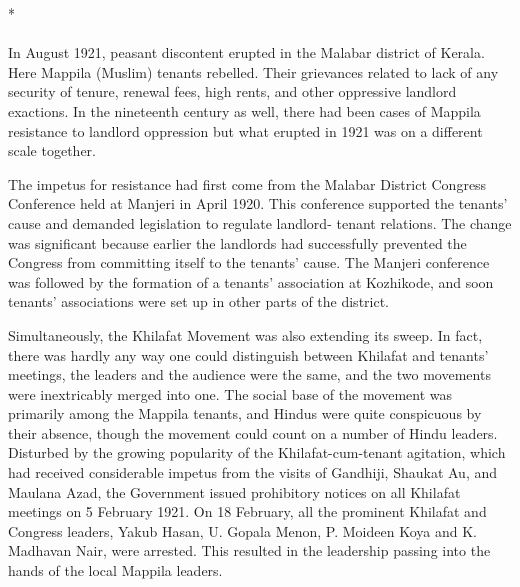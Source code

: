 \begin{multicols}{2}
\begin{center}*\end{center}

\paragraph*{}

In August 1921, peasant discontent erupted in the Malabar district of Kerala. Here Mappila (Muslim) tenants rebelled. Their grievances related to lack of any security of tenure, renewal fees, high rents, and other oppressive landlord exactions. In the nineteenth century as well, there had been cases of Mappila resistance to landlord oppression but what erupted in 1921 was on a different scale together.

The impetus for resistance had first come from the Malabar District Congress Conference held at Manjeri in April 1920. This conference supported the tenants' cause and demanded legislation to regulate landlord- tenant relations. The change was significant because earlier the landlords had successfully prevented the Congress from committing itself to the tenants' cause. The Manjeri conference was followed by the formation of a tenants' association at Kozhikode, and soon tenants' associations were set up in other parts of the district.

Simultaneously, the Khilafat Movement was also extending its sweep. In fact, there was hardly any way one could distinguish between Khilafat and tenants' meetings, the leaders and the audience were the same, and the two movements were inextricably merged into one. The social base of the movement was primarily among the Mappila tenants, and Hindus were quite conspicuous by their absence, though the movement could count on a number of Hindu leaders. Disturbed by the growing popularity of the Khilafat-cum-tenant agitation, which had received considerable impetus from the visits of Gandhiji, Shaukat Au, and Maulana Azad, the Government issued prohibitory notices on all Khilafat meetings on 5 February 1921. On 18 February, all the prominent Khilafat and Congress leaders, Yakub Hasan, U. Gopala Menon, P. Moideen Koya and K. Madhavan Nair, were arrested. This resulted in the leadership passing into the hands of the local Mappila leaders.


\end{multicols}

